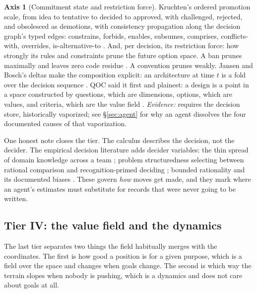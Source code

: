 \documentclass[11pt,oneside]{article}
\theoremstyle{definition}
\newtheorem{axis}{Axis}
\begin{document}
\begin{axis}[Commitment state and restriction force]\label{ax:state}
Kruchten's ordered promotion scale, from idea to tentative to decided to approved, with
challenged, rejected, and obsolesced as demotions, with consistency propagation along the
decision graph's typed edges: constrains, forbids, enables, subsumes, comprises, conflicts-with,
overrides, is-alternative-to \cite{kruchten2004}. And, per decision, its restriction force: how
strongly its rules and constraints prune the future option space. A ban prunes maximally and
leaves zero code residue \cite{kruchten2004}. A convention prunes weakly. Jansen and Bosch's
deltas make the composition explicit: an architecture at time $t$ is a fold over the decision
sequence \cite{jansenbosch2005}. QOC said it first and plainest: a design is a point in a space
constructed by questions, which are dimensions, options, which are values, and criteria, which
are the value field \cite{maclean1991}. \emph{Evidence:} requires the decision store,
historically vaporized; see \S\ref{sec:agent} for why an agent dissolves the four documented
causes of that vaporization.
\end{axis}

One honest note closes the tier. The calculus describes the decision, not the decider. The
empirical decision literature adds decider variables: the thin spread of domain knowledge across
a team \cite{curtis1988}; problem structuredness selecting between rational comparison and
recognition-primed deciding \cite{zannier2007}; bounded rationality and its documented biases
\cite{vanvliettang2016}. These govern \emph{how} moves get made, and they mark where an agent's
estimates must substitute for records that were never going to be written.

\subsection{Tier IV: the value field and the dynamics}\label{sec:dynamics}

The last tier separates two things the field habitually merges with the coordinates. The first
is how good a position is for a given purpose, which is a field over the space and changes when
goals change. The second is which way the terrain slopes when nobody is pushing, which is a
dynamics and does not care about goals at all.
\end{document}
